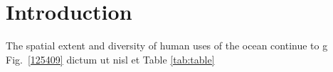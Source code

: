 \section{Introduction}
\label{introduction}

The spatial extent and diversity of human uses of the ocean continue to g Fig.~\ref{125409} dictum ut nisl et Table \ref{tab:table}
